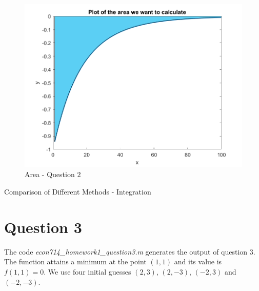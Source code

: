 \documentclass[a4paper,12pt]{article}
\begin{document}
    \begin{figure}[!htbp]
        \centering
       \includegraphics{econ714_homework1_question2_plot.png}
        \caption{Area - Question $2$} 
        \label{area_part2}
    \end{figure}
    
    \begin{table}[!htbp]
        \centering
        \caption[Short Caption for LoT]{Comparison of Different Methods - Integration}\label{table_ex2}
    \end{table}
    
 
    
    
    \medskip
    \medskip
    \section*{Question 3}   
    \medskip
    
    The code \textit{econ714\_homework1\_question3.m} generates the output of question $3$. The function attains a minimum at the point $(1,1)$ and its value is $f(1,1)=0$. We use four initial guesses $(2,3)$, $(2,-3)$, $(-2,3)$ and $(-2,-3)$. 
    
\end{document}
